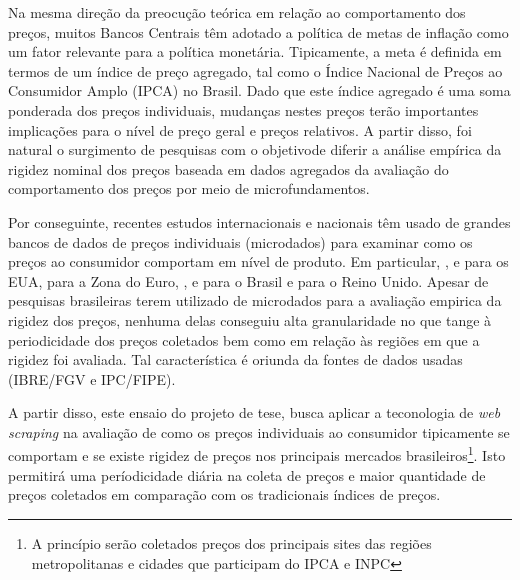 \documentclass[twoside,a4paper,11pt]{report}
\begin{document}
Na mesma direção da preocução teórica em relação ao comportamento dos preços, muitos Bancos Centrais têm adotado a política de metas de inflação como um fator relevante para a política monetária. Tipicamente, a meta é definida em termos de um índice de preço agregado, tal como o Índice Nacional de Preços ao Consumidor Amplo (IPCA) no Brasil. Dado que este índice agregado é uma soma ponderada dos preços individuais, mudanças nestes preços terão importantes implicações para o nível de preço geral e preços relativos. A partir disso, foi natural o surgimento de pesquisas com o objetivode diferir a análise empírica da rigidez nominal dos preços baseada em dados agregados da avaliação do comportamento dos preços por meio de microfundamentos. 

Por conseguinte, recentes estudos internacionais e nacionais têm usado de grandes bancos de dados de preços individuais (microdados) para examinar como os preços ao consumidor comportam em nível de produto. Em particular, \citet{bils2004some}, \citet{nakamura2008five} e \citet{klenow2008state} para os EUA, \citet{dhyne2006price} para a Zona do Euro, \citet{gouvea2007nominal}, \citet{matos2009comportamento} e \citet{lopes2008rigidez} para o Brasil e \citet{bunn2012examining} para o Reino Unido. Apesar de pesquisas brasileiras terem utilizado de microdados para a avaliação empirica da rigidez dos preços, nenhuma delas conseguiu alta granularidade no que tange à periodicidade dos preços coletados bem como em relação às regiões em que a rigidez foi avaliada. Tal característica é oriunda da fontes de dados usadas (IBRE/FGV e IPC/FIPE). 

A partir disso, este ensaio do projeto de tese, busca aplicar a teconologia de \emph{web scraping} na avaliação de como os preços individuais ao consumidor tipicamente se comportam e se existe rigidez de preços nos principais mercados brasileiros\footnote{A princípio serão coletados preços dos principais sites das regiões metropolitanas e cidades que participam do IPCA e INPC}. Isto permitirá uma períodicidade diária na coleta de preços e maior quantidade de preços coletados em comparação com os tradicionais índices de preços.  
\end{document}
